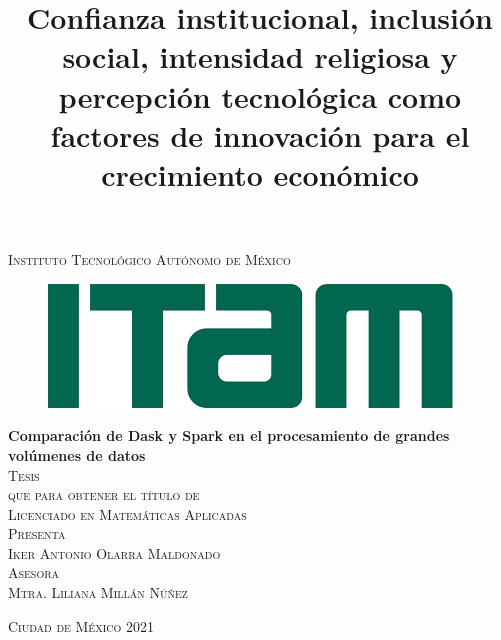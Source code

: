 \documentclass[11pt, oneside]{book}
\begin{document}

\title{Confianza institucional, inclusión social, intensidad religiosa y percepción tecnológica como factores de innovación para el crecimiento económico} %

\begin{titlepage}
\begin{center}

\textsc{\Large Instituto Tecnológico Autónomo de México}\\[2em]

\begin{figure}[h]
\begin{center}
\includegraphics[scale=0.50]{itam_logo.png}
\end{center}
\end{figure}


\textbf{\LARGE Comparación de Dask y Spark en el procesamiento de grandes volúmenes de datos}\\[2em]

\textsc{\large Tesis}\\[1em]

\textsc{\large que para obtener el título de}\\[1em]

\textsc{\LARGE Licenciado en Matemáticas Aplicadas}\\[1em]

\textsc{\large Presenta}\\[1em]

\textsc{\LARGE Iker Antonio Olarra Maldonado}\\[1em]

\textsc{\large Asesora}\\[1em]

\textsc{\LARGE Mtra. Liliana Millán Núñez}\\[2em]


\end{center}

\vspace*{\fill}
\textsc{Ciudad de México \hspace*{\fill} 2021}

\end{titlepage}
\end{document}
